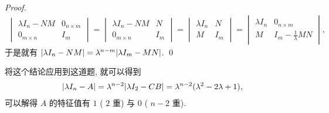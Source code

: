 \begin{exercise}[series=exer]
\begin{answer}
\begin{proof}
\begin{align*}
                \begin{vmatrix}
                    \lambda I_{n} - NM & 0_{n \times m} \\ 0_{m \times n} & I_{m} 
                \end{vmatrix} 
                =
                \begin{vmatrix}
                    \lambda I_{n} - NM & N \\ 0_{m \times n} & I_{m} 
                \end{vmatrix}
                =
                \begin{vmatrix}
                    \lambda I_{n} & N \\ M & I_{m} 
                \end{vmatrix}
                =
                \begin{vmatrix}
                    \lambda I_{n} & 0_{n \times m} \\ M & I_{m} - \frac{1}{\lambda} MN
                \end{vmatrix},
            \end{align*}
            于是就有 $ \abs{\lambda I_{n} - NM} = \lambda^{n - m}\abs{\lambda I_{m} - MN} $. \qed
        \end{proof}

        将这个结论应用到这道题, 就可以得到
        \begin{align*}
            \abs{\lambda I_{n} - A} = \lambda^{n - 2}\abs{\lambda I_{2} - CB} = \lambda^{n - 2}(\lambda^{2} - 2\lambda + 1),
        \end{align*}
        可以解得 $ A $ 的特征值有 $ 1 $ ( $ 2 $ 重) 与 $ 0 $ ( $ n - 2 $ 重).


\end{answer}
\end{exercise}
